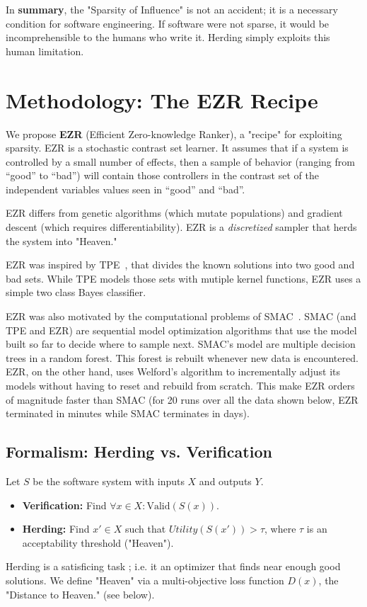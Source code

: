 \documentclass[pdflatex,sn-basic]{sn-jnl}
\begin{document}
In {\bf summary}, the "Sparsity of Influence" is not an accident; it is a 
necessary condition for software engineering. If software were not sparse, 
it would be incomprehensible to the humans who write it. Herding simply 
exploits this human limitation.

\section{Methodology: The EZR Recipe}
We propose \textbf{EZR} (Efficient Zero-knowledge Ranker), a "recipe" for 
exploiting sparsity. EZR is a stochastic contrast set learner.
It assumes that if a system is controlled by a small number of effects, then   a   sample of behavior (ranging from ``good'' to ``bad'') will contain those controllers in the  contrast set of the independent variables values seen in ``good'' and ``bad''. 

EZR differs 
from genetic algorithms (which mutate populations) and gradient descent 
(which requires differentiability). EZR is a \textit{discretized} sampler 
that herds the system into "Heaven."

EZR was inspired by TPE~\citep{Bergstra11}, that divides the known solutions into two good and bad sets.  While TPE models those sets with mutiple kernel functions, EZR uses a simple two class Bayes classifier.

EZR was also motivated by the computational problems of SMAC~\citep{hutter2011sequential}. SMAC (and TPE and EZR) are
sequential model optimization algorithms that use
the model built so far to decide where to sample
next. SMAC's model are  multiple decision trees in a random forest. This forest is rebuilt whenever new data is encountered. EZR, on the other hand, uses Welford's algorithm to incrementally adjust its models without having to reset and rebuild from scratch. This make EZR
orders of magnitude faster than SMAC (for 20 runs over all the data shown below, EZR terminated in minutes while SMAC terminates in days).

\subsection{Formalism: Herding vs. Verification}
Let $S$ be the software system with inputs $X$ and outputs $Y$.
\begin{itemize}
    \item \textbf{Verification:} Find $\forall x \in X: \text{Valid}(S(x))$.
    \item \textbf{Herding:} Find $x' \in X$ such that $Utility(S(x')) > \tau$, 
    where $\tau$ is an acceptability threshold ("Heaven").
\end{itemize}
Herding is a satisficing task \citep{Simon1956};
i.e. it an optimizer that finds near enough good solutions.
We define "Heaven" via a 
multi-objective loss function $D(x)$, the "Distance to Heaven." (see below).
\end{document}
